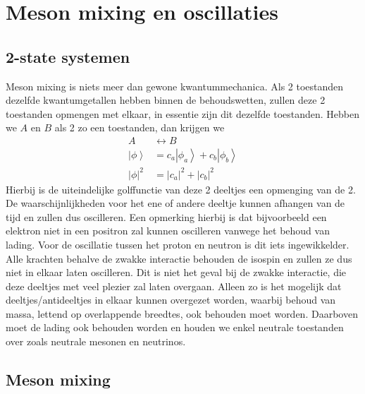 \documentclass[../main.tex]{subfiles}
\begin{document}
\section{Meson mixing en oscillaties}%
\label{sec:meson_mixing_en_oscillaties}

\subsection{2-state systemen}%
\label{sub:2_state_systemen}

Meson mixing is niets meer dan gewone kwantummechanica. Als 2 toestanden dezelfde kwantumgetallen hebben binnen de behoudswetten, zullen deze 2 toestanden opmengen met elkaar, in essentie zijn dit dezelfde toestanden. Hebben we $A$ en $B$ als 2 zo een toestanden, dan krijgen we
\begin{equation}
    \begin{aligned}
        \label{eq:opmenhing_2_toestanden}
        A & \leftrightarrow B \\
        \left| \phi\right>&=c_{a}\left|\phi_{a}\right>+c_{b}\left| \phi_{b} \right>\\
        |\phi|^{2} &=\left|c_{a}\right|^{2}+\left|c_{b}\right|^{2}
    \end{aligned}
\end{equation}
Hierbij is de uiteindelijke golffunctie van deze 2 deeltjes een opmenging van de 2. De waarschijnlijkheden voor het ene of andere deeltje kunnen afhangen van de tijd en zullen dus oscilleren. Een opmerking hierbij is dat bijvoorbeeld een elektron niet in een positron zal kunnen oscilleren vanwege het behoud van lading. Voor de oscillatie tussen het proton en neutron is dit iets ingewikkelder. Alle krachten behalve de zwakke interactie behouden de isospin en zullen ze dus niet in elkaar laten oscilleren. Dit is niet het geval bij de zwakke interactie, die deze deeltjes met veel plezier zal laten overgaan. Alleen zo is het mogelijk dat deeltjes/antideeltjes in elkaar kunnen overgezet worden, waarbij behoud van massa, lettend op overlappende breedtes, ook behouden moet worden. Daarboven moet de lading ook behouden worden en houden we enkel neutrale toestanden over zoals neutrale mesonen en neutrinos.

\subsection{Meson mixing}%
\label{sub:meson_mixing}
\end{document}
